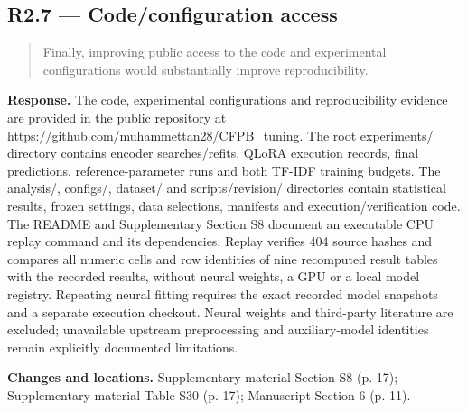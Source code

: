 \documentclass[11pt,a4paper]{article}
\begin{document}
\subsection*{R2.7 — Code/configuration access}
\begin{quote}\small Finally, improving public access to the code and experimental configurations would substantially improve reproducibility.\end{quote}
\textbf{Response.} The code, experimental configurations and reproducibility evidence are provided in the public repository at \url{https://github.com/muhammettan28/CFPB_tuning}. The root experiments/ directory contains encoder searches/refits, QLoRA execution records, final predictions, reference-parameter runs and both TF-IDF training budgets. The analysis/, configs/, dataset/ and scripts/revision/ directories contain statistical results, frozen settings, data selections, manifests and execution/verification code. The README and Supplementary Section S8 document an executable CPU replay command and its dependencies. Replay verifies 404 source hashes and compares all numeric cells and row identities of nine recomputed result tables with the recorded results, without neural weights, a GPU or a local model registry. Repeating neural fitting requires the exact recorded model snapshots and a separate execution checkout. Neural weights and third-party literature are excluded; unavailable upstream preprocessing and auxiliary-model identities remain explicitly documented limitations.

\textbf{Changes and locations.} Supplementary material Section S8 (p. 17); Supplementary material Table S30 (p. 17); Manuscript Section 6 (p. 11).
\end{document}
